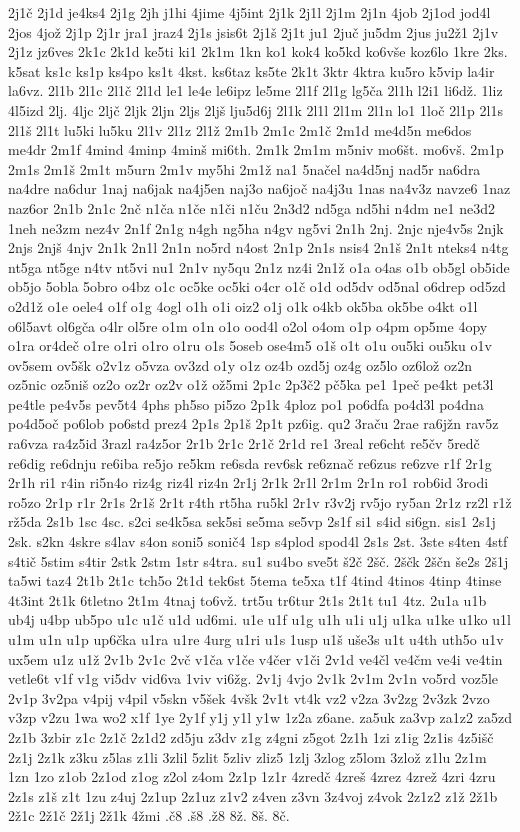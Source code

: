 {2j1č
2j1d
je4ks4
2j1g
2jh
j1hi
4jime
4j5int
2j1k
2j1l
2j1m
2j1n
4job
2j1od
jod4l
2jos
4jož
2j1p
2j1r
jra1
jraz4
2j1s
jsis6t
2j1š
2j1t
ju1
2juč
ju5dm
2jus
ju2ž1
2j1v
2j1z
jz6ves
2k1c
2k1d
ke5ti
ki1
2k1m
1kn
ko1
kok4
ko5kd
ko6vše
koz6lo
1kre
2ks.
k5sat
ks1c
ks1p
ks4po
ks1t
4kst.
ks6taz
ks5te
2k1t
3ktr
4ktra
ku5ro
k5vip
la4ir
la6vz.
2l1b
2l1c
2l1č
2l1d
le1
le4e
le6ipz
le5me
2l1f
2l1g
lg5ča
2l1h
l2i1
li6dž.
1liz
4l5izd
2lj.
4ljc
2ljč
2ljk
2ljn
2ljs
2ljš
lju5d6j
2l1k
2l1l
2l1m
2l1n
lo1
1loč
2l1p
2l1s
2l1š
2l1t
lu5ki
lu5ku
2l1v
2l1z
2l1ž
2m1b
2m1c
2m1č
2m1d
me4d5n
me6dos
me4dr
2m1f
4mind
4minp
4minš
mi6th.
2m1k
2m1m
m5niv
mo6št.
mo6vš.
2m1p
2m1s
2m1š
2m1t
m5urn
2m1v
my5hi
2m1ž
na1
5načel
na4d5nj
nad5r
na6dra
na4dre
na6dur
1naj
na6jak
na4j5en
naj3o
na6joč
na4j3u
1nas
na4v3z
navze6
1naz
naz6or
2n1b
2n1c
2nč
n1ča
n1če
n1či
n1ču
2n3d2
nd5ga
nd5hi
n4dm
ne1
ne3d2
1neh
ne3zm
nez4v
2n1f
2n1g
n4gh
ng5ha
n4gv
ng5vi
2n1h
2nj.
2njc
nje4v5s
2njk
2njs
2njš
4njv
2n1k
2n1l
2n1n
no5rd
n4ost
2n1p
2n1s
nsis4
2n1š
2n1t
nteks4
n4tg
nt5ga
nt5ge
n4tv
nt5vi
nu1
2n1v
ny5qu
2n1z
nz4i
2n1ž
o1a
o4as
o1b
ob5gl
ob5ide
ob5jo
5obla
5obro
o4bz
o1c
oc5ke
oc5ki
o4cr
o1č
o1d
od5dv
od5nal
o6drep
od5zd
o2d1ž
o1e
oele4
o1f
o1g
4ogl
o1h
o1i
oiz2
o1j
o1k
o4kb
ok5ba
ok5be
o4kt
o1l
o6l5avt
ol6gča
o4lr
ol5re
o1m
o1n
o1o
ood4l
o2ol
o4om
o1p
o4pm
op5me
4opy
o1ra
or4deč
o1re
o1ri
o1ro
o1ru
o1s
5oseb
ose4m5
o1š
o1t
o1u
ou5ki
ou5ku
o1v
ov5sem
ov5šk
o2v1z
o5vza
ov3zd
o1y
o1z
oz4b
ozd5j
oz4g
oz5lo
oz6lož
oz2n
oz5nic
oz5niš
oz2o
oz2r
oz2v
o1ž
ož5mi
2p1c
2p3č2
pč5ka
pe1
1peč
pe4kt
pet3l
pe4tle
pe4v5s
pev5t4
4phs
ph5so
pi5zo
2p1k
4ploz
po1
po6dfa
po4d3l
po4dna
po4d5oč
po6lob
po6std
prez4
2p1s
2p1š
2p1t
pz6ig.
qu2
3raču
2rae
ra6jžn
rav5z
ra6vza
ra4z5id
3razl
ra4z5or
2r1b
2r1c
2r1č
2r1d
re1
3real
re6cht
re5čv
5redč
re6dig
re6dnju
re6iba
re5jo
re5km
re6sda
rev6sk
re6znač
re6zus
re6zve
r1f
2r1g
2r1h
ri1
r4in
ri5n4o
riz4g
riz4l
riz4n
2r1j
2r1k
2r1l
2r1m
2r1n
ro1
rob6id
3rodi
ro5zo
2r1p
r1r
2r1s
2r1š
2r1t
r4th
rt5ha
ru5kl
2r1v
r3v2j
rv5jo
ry5an
2r1z
rz2l
r1ž
rž5da
2s1b
1sc
4sc.
s2ci
se4k5sa
sek5si
se5ma
se5vp
2s1f
si1
s4id
si6gn.
sis1
2s1j
2sk.
s2kn
4skre
s4lav
s4on
soni5
sonič4
1sp
s4plod
spod4l
2s1s
2st.
3ste
s4ten
4stf
s4tič
5stim
s4tir
2stk
2stm
1str
s4tra.
su1
su4bo
sve5t
š2č
2šč.
2ščk
2ščn
še2s
2š1j
ta5wi
taz4
2t1b
2t1c
tch5o
2t1d
tek6st
5tema
te5xa
t1f
4tind
4tinos
4tinp
4tinse
4t3int
2t1k
6tletno
2t1m
4tnaj
to6vž.
trt5u
tr6tur
2t1s
2t1t
tu1
4tz.
2u1a
u1b
ub4j
u4bp
ub5po
u1c
u1č
u1d
ud6mi.
u1e
u1f
u1g
u1h
u1i
u1j
u1ka
u1ke
u1ko
u1l
u1m
u1n
u1p
up6čka
u1ra
u1re
4urg
u1ri
u1s
1usp
u1š
uše3s
u1t
u4th
uth5o
u1v
ux5em
u1z
u1ž
2v1b
2v1c
2vč
v1ča
v1če
v4čer
v1či
2v1d
ve4čl
ve4čm
ve4i
ve4tin
vetle6t
v1f
v1g
vi5dv
vid6va
1viv
vi6žg.
2v1j
4vjo
2v1k
2v1m
2v1n
vo5rd
voz5le
2v1p
3v2pa
v4pij
v4pil
v5skn
v5šek
4všk
2v1t
vt4k
vz2
v2za
3v2zg
2v3zk
2vzo
v3zp
v2zu
1wa
wo2
x1f
1ye
2y1f
y1j
y1l
y1w
1z2a
z6ane.
za5uk
za3vp
za1z2
za5zd
2z1b
3zbir
z1c
2z1č
2z1d2
zd5ju
z3dv
z1g
z4gni
z5got
2z1h
1zi
z1ig
2z1is
4z5išč
2z1j
2z1k
z3ku
z5las
z1li
3zlil
5zlit
5zliv
zliz5
1zlj
3zlog
z5lom
3zlož
z1lu
2z1m
1zn
1zo
z1ob
2z1od
z1og
z2ol
z4om
2z1p
1z1r
4zredč
4zreš
4zrez
4zrež
4zri
4zru
2z1s
z1š
z1t
1zu
z4uj
2z1up
2z1uz
z1v2
z4ven
z3vn
3z4voj
z4vok
2z1z2
z1ž
2ž1b
2ž1c
2ž1č
2ž1j
2ž1k
4žmi
.č8
.š8
.ž8
8ž.
8š.
8č.
}
\endinput